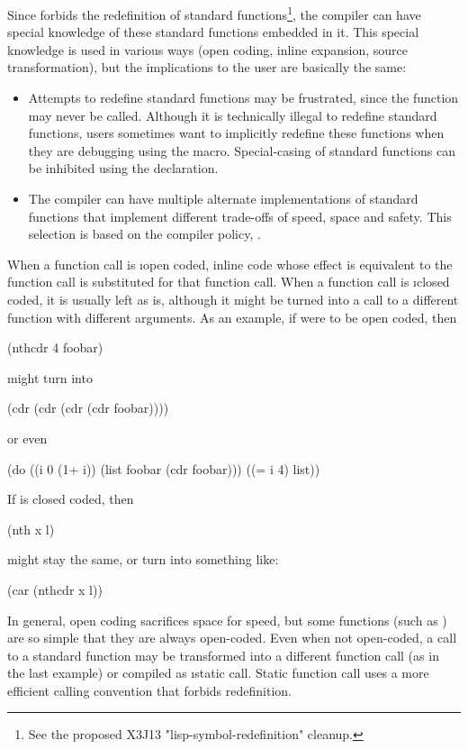 Since \clisp{} forbids the redefinition of standard functions\footnote{See the
proposed X3J13 "lisp-symbol-redefinition" cleanup.}, the compiler can have
special knowledge of these standard functions embedded in it.  This special
knowledge is used in various ways (open coding, inline expansion, source
transformation), but the implications to the user are basically the same:
\begin{itemize}

\item
Attempts to redefine standard functions may be frustrated, since the function
may never be called.  Although it is technically illegal to redefine standard
functions, users sometimes want to implicitly redefine these functions when
they are debugging using the  macro.  Special-casing of standard
functions can be inhibited using the  declaration.

\item
The compiler can have multiple alternate implementations of standard functions
that implement different trade-offs of speed, space and safety.  This selection
is based on the compiler policy, .
\end{itemize}


When a function call is \i{open coded}, inline code whose effect is
equivalent to the function call is substituted for that function call.
When a function call is \i{closed coded}, it is usually left as is,
although it might be turned into a call to a different function with
different arguments.  As an example, if  were to be open
coded, then
\begin{lisp}
(nthcdr 4 foobar)
\end{lisp}
might turn into
\begin{lisp}
(cdr (cdr (cdr (cdr foobar))))
\end{lisp}
or even 
\begin{lisp}
(do ((i 0 (1+ i))
     (list foobar (cdr foobar)))
    ((= i 4) list))
\end{lisp}

If  is closed coded, then
\begin{lisp}
(nth x l)
\end{lisp}
might stay the same, or turn into something like:
\begin{lisp}
(car (nthcdr x l))
\end{lisp}

In general, open coding sacrifices space for speed, but some functions (such as
) are so simple that they are always open-coded.  Even when not
open-coded, a call to a standard function may be transformed into a different
function call (as in the last example) or compiled as \i{static call}.  Static
function call uses a more efficient calling convention that forbids
redefinition.


